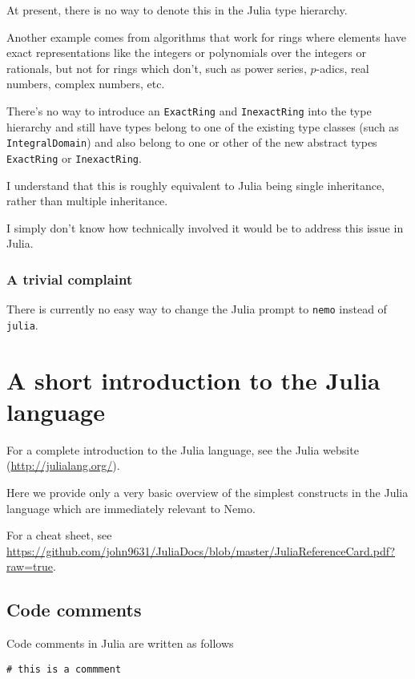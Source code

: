 \documentclass[a4paper,10pt]{article}
\newcommand{\code}{\lstinline}
\begin{document}
At present, there is no way to denote this in the Julia type hierarchy.

Another example comes from algorithms that work for rings where elements have exact
representations like the integers or polynomials over the integers or rationals, but not for rings
which don't, such as power series, $p$-adics, real numbers, complex numbers, etc.

There's no way to introduce an \code{ExactRing} and \code{InexactRing} into the type hierarchy
and still have types belong to one of the existing type classes (such as \code{IntegralDomain})
and also belong to one or other of the new abstract types \code{ExactRing} or \code{InexactRing}.

I understand that this is roughly equivalent to Julia being single inheritance, rather than
multiple inheritance.

I simply don't know how technically involved it would be to address this issue in Julia. 

\subsubsection{A trivial complaint}

There is currently no easy way to change the Julia prompt to \code{nemo} instead of \code{julia}.

\section{A short introduction to the Julia language}

For a complete introduction to the Julia language, see the Julia website (\url{http://julialang.org/}).

Here we provide only a very basic overview of the simplest constructs in the Julia language which are
immediately relevant to Nemo.

For a cheat sheet, see \url{https://github.com/john9631/JuliaDocs/blob/master/JuliaReferenceCard.pdf?raw=true}.


\subsection{Code comments}

Code comments in Julia are written as follows

\begin{lstlisting}
# this is a commment
\end{lstlisting}
\end{document}
